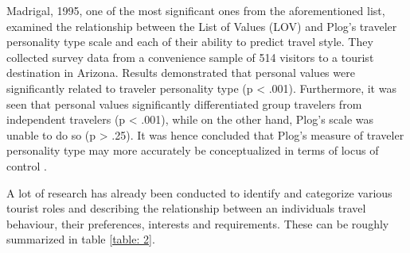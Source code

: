 Madrigal, 1995, one of the most significant ones from the aforementioned list, examined the relationship between the List of Values (LOV) and Plog's traveler personality type scale and each of their ability to predict travel style. They collected survey data from a convenience sample of 514 visitors to a tourist destination in Arizona. Results demonstrated that personal values were significantly related to traveler personality type (p < .001). Furthermore, it was seen that personal values significantly differentiated group travelers from independent travelers (p < .001), while on the other hand, Plog's scale was unable to do so (p > .25). It was hence concluded that Plog's measure of traveler personality type may more accurately be conceptualized in terms of locus of control \cite{madrigal1995personal}.


A lot of research has already been conducted to identify and categorize various tourist roles and describing the relationship between an individual\textquotesingle s travel behaviour, their preferences, interests and requirements. These can be roughly summarized in table \ref{table: 2}.

